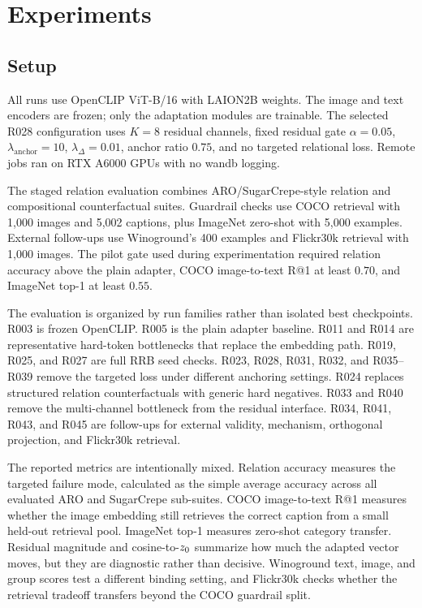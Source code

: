 \section{Experiments}

\subsection{Setup}

All runs use OpenCLIP ViT-B/16 with LAION2B weights. The image and text encoders are frozen; only the adaptation modules are trainable. The selected R028 configuration uses $K=8$ residual channels, fixed residual gate $\alpha=0.05$, $\lambda_{\mathrm{anchor}}=10$, $\lambda_{\Delta}=0.01$, anchor ratio $0.75$, and no targeted relational loss. Remote jobs ran on RTX A6000 GPUs with no wandb logging.

The staged relation evaluation combines ARO/SugarCrepe-style relation and compositional counterfactual suites. Guardrail checks use COCO retrieval with 1,000 images and 5,002 captions, plus ImageNet zero-shot with 5,000 examples. External follow-ups use Winoground's 400 examples and Flickr30k retrieval with 1,000 images. The pilot gate used during experimentation required relation accuracy above the plain adapter, COCO image-to-text R@1 at least $0.70$, and ImageNet top-1 at least $0.55$.

The evaluation is organized by run families rather than isolated best checkpoints. R003 is frozen OpenCLIP. R005 is the plain adapter baseline. R011 and R014 are representative hard-token bottlenecks that replace the embedding path. R019, R025, and R027 are full RRB seed checks. R023, R028, R031, R032, and R035--R039 remove the targeted loss under different anchoring settings. R024 replaces structured relation counterfactuals with generic hard negatives. R033 and R040 remove the multi-channel bottleneck from the residual interface. R034, R041, R043, and R045 are follow-ups for external validity, mechanism, orthogonal projection, and Flickr30k retrieval.

The reported metrics are intentionally mixed. Relation accuracy measures the targeted failure mode, calculated as the simple average accuracy across all evaluated ARO and SugarCrepe sub-suites. COCO image-to-text R@1 measures whether the image embedding still retrieves the correct caption from a small held-out retrieval pool. ImageNet top-1 measures zero-shot category transfer. Residual magnitude and cosine-to-$z_0$ summarize how much the adapted vector moves, but they are diagnostic rather than decisive. Winoground text, image, and group scores test a different binding setting, and Flickr30k checks whether the retrieval tradeoff transfers beyond the COCO guardrail split.

